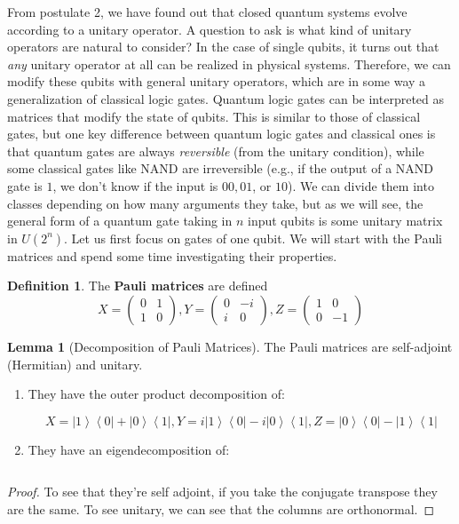 \documentclass{article}
\newcommand{\ket}[1]{\ensuremath{\left|#1\right\rangle}}
\newcommand{\bra}[1]{\ensuremath{\left\langle#1\right|}}
\theoremstyle{definition}
\newtheorem{lemma}[theorem]{Lemma}
\newtheorem{definition}{Definition}[section]
\begin{document}
      From postulate 2, we have found out that closed quantum systems evolve according to a unitary operator. A question to ask is what kind of unitary operators are natural to consider? In the case of single qubits, it turns out that \textit{any} unitary operator at all can be realized in physical systems. Therefore, we can modify these qubits with general unitary operators, which are in some way a generalization of classical logic gates. Quantum logic gates can be interpreted as matrices that modify the state of qubits. This is similar to those of classical gates, but one key difference between quantum logic gates and classical ones is that quantum gates are always \textit{reversible} (from the unitary condition), while some classical gates like NAND are irreversible (e.g., if the output of a NAND gate is $1$, we don't know if the input is $00, 01$, or $10$). We can divide them into classes depending on how many arguments they take, but as we will see, the general form of a quantum gate taking in $n$ input qubits is some unitary matrix in $U(2^n)$. Let us first focus on gates of one qubit. We will start with the Pauli matrices and spend some time investigating their properties.  

      \begin{definition} 
        The \textbf{Pauli matrices} are defined 
          \[
            X = \begin{pmatrix} 0 & 1 \\ 1 & 0 \end{pmatrix},  
            Y = \begin{pmatrix} 0 & -i \\ i & 0 \end{pmatrix},   
            Z = \begin{pmatrix} 1 & 0 \\ 0 & -1 \end{pmatrix}  
          \]
      \end{definition}

      \begin{lemma}[Decomposition of Pauli Matrices]
        The Pauli matrices are self-adjoint (Hermitian) and unitary. 
      
        \begin{enumerate}
          \item They have the outer product decomposition of: 

            \[X = \ket{1} \bra{0} + \ket{0} \bra{1}, Y = i \ket{1} \bra{0} - i \ket{0} \bra{1}, Z = \ket{0} \bra{0} - \ket{1} \bra{1}\]

          \item They have an eigendecomposition of: 

            \[\]

        \end{enumerate}

      \end{lemma}
      \begin{proof}
        To see that they're self adjoint, if you take the conjugate transpose they are the same. To see unitary, we can see that the columns are orthonormal. 
      \end{proof}
\end{document}
